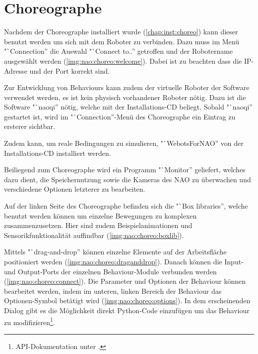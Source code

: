 \chapter{Choreographe}

    Nachdem der Choreographe installiert wurde (\ref{chap:inst:choreo}) kann
    dieser benutzt werden um sich mit dem Roboter zu verbinden.
    Dazu muss im Menü "`Connection'' die Auswahl "`Connect to..'' getroffen
    und der Robotername ausgewählt werden (\autoref{img:nao:choreo:welcome}).
    Dabei ist zu beachten dass die \ac{IP}-Adresse und der Port korrekt sind.

    Zur Entwicklung von Behaviours kann zudem der virtuelle Roboter der
    Software verwendet werden, es ist kein physisch vorhandener Roboter nötig.
    Dazu ist die Software "`naoqi'' nötig, welche mit der Installations-\ac{CD}
    beliegt.
    Sobald "`naoqi'' gestartet ist, wird im "`Connection''-Menü des Choreographe
    ein Eintrag zu ersterer sichtbar.

    Zudem kann, um reale Bedingungen zu simulieren, "`WebotsForNAO'' von der
    Installations-\ac{CD} installiert werden.

    Beiliegend zum Choreographe wird ein Programm "`Monitor'' geliefert, welches
    dazu dient, die Speichernutzung sowie die Kameras des NAO zu überwachen und
    verschiedene Optionen letzterer zu bearbeiten.


    Auf der linken Seite des Choreographe befinden sich die "`Box libraries'',
    welche benutzt werden können um einzelne Bewegungen zu komplexen
    zusammenzusetzen.
    Hier sind zudem Beispielanimationen und Sensorikfunktionalität auffindbar
    (\autoref{img:nao:choreo:boxlib}).

    Mittels "`drag-and-drop'' können einzelne Elemente auf der Arbeitsfläche
    positioniert werden (\autoref{img:nao:choreo:draganddrop}).
    Danach können die Input- und Output-Ports der einzelnen Behaviour-Module
    verbunden werden (\autoref{img:nao:choreo:connect}).
    Die Parameter und Optionen der Behaviour können bearbeitet werden, indem im
    unteren, linken Bereich der Behaviour das Optionen-Symbol betätigt wird
    (\autoref{img:nao:choreo:options}).
    In dem erscheinenden Dialog gibt es die Möglichkeit direkt Python-Code
    einzufügen um das Behaviour zu modifizieren\footnote{
        \ac{API}-Dokumentation unter \cite{nao:api}.
    }.


